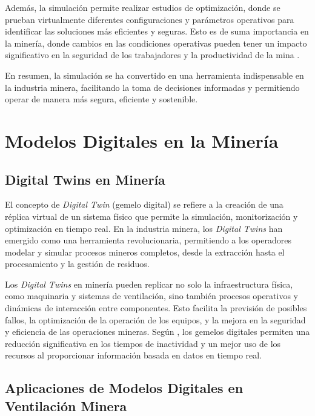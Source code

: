 Además, la simulación permite realizar estudios de optimización, donde se prueban virtualmente diferentes configuraciones y parámetros operativos para identificar las soluciones más eficientes y seguras. Esto es de suma importancia en la minería, donde cambios en las condiciones operativas pueden tener un impacto significativo en la seguridad de los trabajadores y la productividad de la mina \cite{galvin2016mining}.

En resumen, la simulación se ha convertido en una herramienta indispensable en la industria minera, facilitando la toma de decisiones informadas y permitiendo operar de manera más segura, eficiente y sostenible.


\section{Modelos Digitales en la Minería}

\subsection{Digital Twins en Minería}

El concepto de \textit{Digital Twin} (gemelo digital) se refiere a la creación de una réplica virtual de un sistema físico que permite la simulación, monitorización y optimización en tiempo real. En la industria minera, los \textit{Digital Twins} han emergido como una herramienta revolucionaria, permitiendo a los operadores modelar y simular procesos mineros completos, desde la extracción hasta el procesamiento y la gestión de residuos.

Los \textit{Digital Twins} en minería pueden replicar no solo la infraestructura física, como maquinaria y sistemas de ventilación, sino también procesos operativos y dinámicas de interacción entre componentes. Esto facilita la previsión de posibles fallos, la optimización de la operación de los equipos, y la mejora en la seguridad y eficiencia de las operaciones mineras. Según \cite{gabor2021digital}, los gemelos digitales permiten una reducción significativa en los tiempos de inactividad y un mejor uso de los recursos al proporcionar información basada en datos en tiempo real.

\subsection{Aplicaciones de Modelos Digitales en Ventilación Minera}

